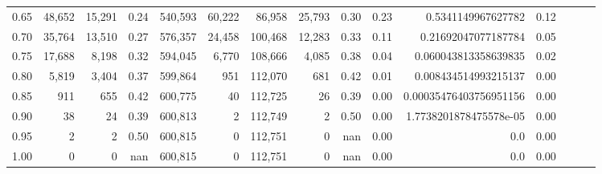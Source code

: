 \begin{tabular}{rrrrrrrrrrrrrrr}
0.65 &  48,652 &  15,291 &  0.24 &  540,593 &   60,222 &   86,958 &   25,793 &  0.30 &  0.23 &      0.5341149967627782 &      0.12 \\
0.70 &  35,764 &  13,510 &  0.27 &  576,357 &   24,458 &  100,468 &   12,283 &  0.33 &  0.11 &     0.21692047077187784 &      0.05 \\
0.75 &  17,688 &   8,198 &  0.32 &  594,045 &    6,770 &  108,666 &    4,085 &  0.38 &  0.04 &    0.060043813358639835 &      0.02 \\
0.80 &   5,819 &   3,404 &  0.37 &  599,864 &      951 &  112,070 &      681 &  0.42 &  0.01 &    0.008434514993215137 &      0.00 \\
0.85 &     911 &     655 &  0.42 &  600,775 &       40 &  112,725 &       26 &  0.39 &  0.00 &  0.00035476403756951156 &      0.00 \\
0.90 &      38 &      24 &  0.39 &  600,813 &        2 &  112,749 &        2 &  0.50 &  0.00 &  1.7738201878475578e-05 &      0.00 \\
0.95 &       2 &       2 &  0.50 &  600,815 &        0 &  112,751 &        0 &   nan &  0.00 &                     0.0 &      0.00 \\
1.00 &       0 &       0 &   nan &  600,815 &        0 &  112,751 &        0 &   nan &  0.00 &                     0.0 &      0.00 \\
\bottomrule
\end{tabular}
